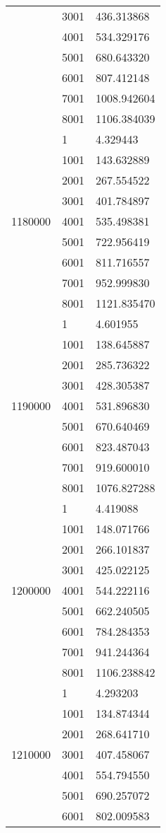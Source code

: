 \begin{table}[htb!]
\begin{tabular}{lll}
 & 3001 & 436.313868 \\
 & 4001 & 534.329176 \\
 & 5001 & 680.643320 \\
 & 6001 & 807.412148 \\
 & 7001 & 1008.942604 \\
 & 8001 & 1106.384039 \\
\multirow[c]{9}{*}{1180000} & 1 & 4.329443 \\
 & 1001 & 143.632889 \\
 & 2001 & 267.554522 \\
 & 3001 & 401.784897 \\
 & 4001 & 535.498381 \\
 & 5001 & 722.956419 \\
 & 6001 & 811.716557 \\
 & 7001 & 952.999830 \\
 & 8001 & 1121.835470 \\
\multirow[c]{9}{*}{1190000} & 1 & 4.601955 \\
 & 1001 & 138.645887 \\
 & 2001 & 285.736322 \\
 & 3001 & 428.305387 \\
 & 4001 & 531.896830 \\
 & 5001 & 670.640469 \\
 & 6001 & 823.487043 \\
 & 7001 & 919.600010 \\
 & 8001 & 1076.827288 \\
\multirow[c]{9}{*}{1200000} & 1 & 4.419088 \\
 & 1001 & 148.071766 \\
 & 2001 & 266.101837 \\
 & 3001 & 425.022125 \\
 & 4001 & 544.222116 \\
 & 5001 & 662.240505 \\
 & 6001 & 784.284353 \\
 & 7001 & 941.244364 \\
 & 8001 & 1106.238842 \\
\multirow[c]{9}{*}{1210000} & 1 & 4.293203 \\
 & 1001 & 134.874344 \\
 & 2001 & 268.641710 \\
 & 3001 & 407.458067 \\
 & 4001 & 554.794550 \\
 & 5001 & 690.257072 \\
 & 6001 & 802.009583 \\

\end{tabular}
\end{table}
